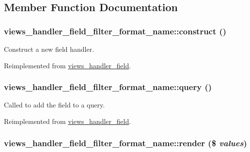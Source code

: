 \subsection{Member Function Documentation}
\hypertarget{classviews__handler__field__filter__format__name_eacc272fd36677b2d56063a578e23d3a}{
\subsubsection[{construct}]{\setlength{\rightskip}{0pt plus 5cm}views\_\-handler\_\-field\_\-filter\_\-format\_\-name::construct ()}}
\label{classviews__handler__field__filter__format__name_eacc272fd36677b2d56063a578e23d3a}


Construct a new field handler. 

Reimplemented from \hyperlink{classviews__handler__field_3d50050864c255b71c842972a45d39f6}{views\_\-handler\_\-field}.\hypertarget{classviews__handler__field__filter__format__name_3032499c14945a87535f1fdfbea57feb}{
\subsubsection[{query}]{\setlength{\rightskip}{0pt plus 5cm}views\_\-handler\_\-field\_\-filter\_\-format\_\-name::query ()}}
\label{classviews__handler__field__filter__format__name_3032499c14945a87535f1fdfbea57feb}


Called to add the field to a query. 

Reimplemented from \hyperlink{classviews__handler__field_4f661f91bcbe80d4a00c30a31456c502}{views\_\-handler\_\-field}.\hypertarget{classviews__handler__field__filter__format__name_1e30b381ab89cb8eb2db40d340de97f6}{
\subsubsection[{render}]{\setlength{\rightskip}{0pt plus 5cm}views\_\-handler\_\-field\_\-filter\_\-format\_\-name::render (\$ {\em values})}}
\label{classviews__handler__field__filter__format__name_1e30b381ab89cb8eb2db40d340de97f6}


